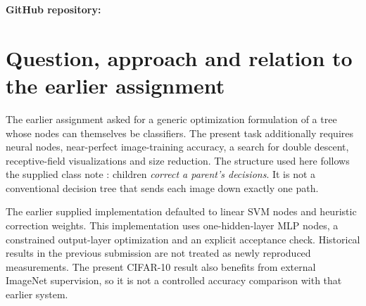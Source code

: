 \documentclass[11pt,a4paper]{article}
\begin{document}
\begin{abstract}
This assignment implements the correction-tree construction from the class notes using small neural networks at every learned node. A frozen ImageNet-pretrained MobileNetV3-Small supplies a shared 576-dimensional representation. Children learn the false-negative and false-positive correction tasks of their parent; a constrained logistic output refit combines their decisions. Across three training seeds, trees with hidden width 16 on CIFAR-10 and width 8 on Cats vs Dogs achieve zero training errors on 45,000 and 17,476 images, respectively. Greedy pruning retains perfect training fit and reduces these models to 11--12 nodes and two nodes. Their mean test accuracies are 88.09\% and 97.52\%; a two-node width-16 Cats vs Dogs model reaches 97.85\%. Wider root-only CIFAR-10 networks generalize better. With clean labels the width sweeps show a validation-log-loss peak near interpolation but no peak in classification error. With 15\% training-label noise, double descent appears in test error: a CIFAR-10 softmax MLP shows the complete decrease--increase--decrease curve (14.7\% at width 8, 33.8\% at width 64, 19.5\% at width 1024), and the Cats vs Dogs root-only MLP and the correction trees on both datasets show a peak followed by descent. Under noise, most of the children's targets (76--89\% below the interpolation threshold) are flipped labels, so the corrections memorize noise; validation-based pruning removes them and restores the root's test error. Node visualizations, root-refitting controls and exact prediction-skipping bounds clarify what the branches contribute and what they do not.
\end{abstract}
\textbf{GitHub repository:} 
\section{Question, approach and relation to the earlier assignment}
The earlier assignment asked for a generic optimization formulation of a tree whose nodes can themselves be classifiers. The present task additionally requires neural nodes, near-perfect image-training accuracy, a search for double descent, receptive-field visualizations and size reduction. The structure used here follows the supplied class note \cite{class}: children \emph{correct a parent's decisions}. It is not a conventional decision tree that sends each image down exactly one path.

The earlier supplied implementation defaulted to linear SVM nodes and heuristic correction weights. This implementation uses one-hidden-layer MLP nodes, a constrained output-layer optimization and an explicit acceptance check. Historical results in the previous submission are not treated as newly reproduced measurements. The present CIFAR-10 result also benefits from external ImageNet supervision, so it is not a controlled accuracy comparison with that earlier system.
\end{document}
